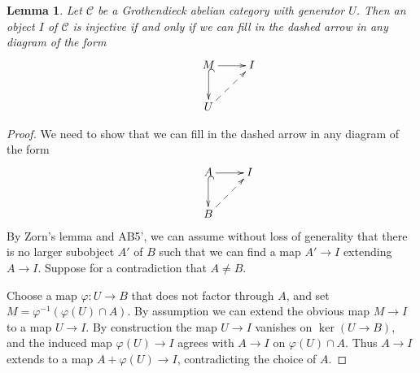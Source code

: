 \documentclass[letterpaper,11pt]{article}
\newtheorem{lem}{Lemma}
\theoremstyle{definition}
\theoremstyle{remark}
\begin{document}
\begin{lem}\label{criterion} Let $\mathcal{C}$ be a Grothendieck abelian category with generator $U$. Then an object $I$ of $\mathcal{C}$ is injective if and only if we can fill in the dashed arrow in any diagram of the form
\begin{align*}
\xymatrix{&M \ar[r] \ar@{^{(}->}[d] & I\\
&U \ar@{-->}[ur]}
\end{align*}
\end{lem}
\begin{proof} We need to show that we can fill in the dashed arrow in any diagram of the form
\begin{align*}
\xymatrix{&A \ar[r] \ar@{^{(}->}[d] & I\\
&B \ar@{-->}[ur]}
\end{align*}
By Zorn's lemma and AB5', we can assume without loss of generality that there is no larger subobject $A'$ of $B$ such that we can find a map $A'\rightarrow I$ extending $A\rightarrow I$. Suppose for a contradiction that $A\ne B$.

Choose a map $\varphi:U\rightarrow B$ that does not factor through $A$, and set $M = \varphi^{-1}(\varphi(U)\cap A)$. By assumption we can extend the obvious map $M\rightarrow I$ to a map $U\rightarrow I$. By construction the map $U\rightarrow I$ vanishes on $\ker(U\rightarrow B)$, and the induced map $\varphi(U) \rightarrow I$ agrees with $A\rightarrow I$ on $\varphi(U)\cap A$. Thus $A\rightarrow I$ extends to a map $A+\varphi(U)\rightarrow I$, contradicting the choice of $A$.
\end{proof}
\end{document}
